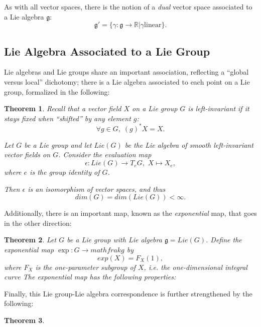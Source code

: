 \documentclass{tufte-handout}
\newtheorem{thrm}{Theorem}
\begin{document}
As with all vector spaces, there is the notion of a \emph{dual} vector space associated to a Lie algebra $\mathfrak{g}$:
$$
\mathfrak{g}' = \{\gamma : \mathfrak{g} \to \mathbb{R} | \gamma \mathrm{linear}\}.
$$

\subsection{Lie Algebra Associated to a Lie Group}
Lie algebras and Lie groups share an important association, reflecting a ``global versus local'' dichotomy; there is a Lie algebra associated to each point on a Lie group, formalized in the following:
\begin{fullwidth}
\begin{thrm}
Recall that a vector field $X$ on a Lie group $G$ is \emph{left-invariant} if it stays fixed when ``shifted'' by any element $g$:
$$
\forall g \in G, \; (g)^*X = X.
$$

Let $G$ be a Lie group and let $Lie(G)$ be the Lie algebra of smooth left-invariant vector fields on $G$. Consider the \emph{evaluation map}
$$
\epsilon: Lie(G) \to T_e G, \, \, X \mapsto X_e,
$$
where $e$ is the group identity of $G$.

Then $\epsilon$ is an isomorphism of vector spaces, and thus
$$
dim(G) = dim(Lie(G)) < \infty.
$$
\end{thrm}
\end{fullwidth}

Additionally, there is an important map, known as the \emph{exponential} map, that goes in the other direction:
\begin{fullwidth}
\begin{thrm}
Let $G$ be a Lie group with Lie algebra $\mathfrak{g} = Lie(G)$. Define the \emph{exponential map} $\exp: G \to mathfrak{g}$ by
$$
exp(X) = F_X(1),
$$
where $F_X$ is the one-parameter subgroup of $X$, i.e. the one-dimensional integral curve
The exponential map has the following properties: %
\end{thrm}
\end{fullwidth}

Finally, this Lie group-Lie algebra correspondence is further strengthened by the following:
\begin{fullwidth}
\begin{thrm}
\end{thrm}
\end{fullwidth}
\end{document}
